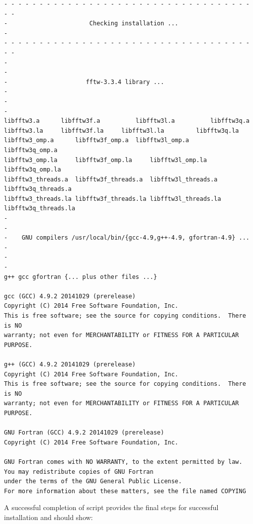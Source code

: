 \documentclass[a4paper,11pt]{article}
\begin{document}
\begin{verbatim}
- - - - - - - - - - - - - - - - - - - - - - - - - - - - - - - - - - - - -
-                       Checking installation ...                       -
- - - - - - - - - - - - - - - - - - - - - - - - - - - - - - - - - - - - -
-                                                                       -
-                      fftw-3.3.4 library ...                           -
-                                                                       -
libfftw3.a	    libfftw3f.a	         libfftw3l.a	      libfftw3q.a
libfftw3.la	    libfftw3f.la	 libfftw3l.la	      libfftw3q.la
libfftw3_omp.a	    libfftw3f_omp.a	 libfftw3l_omp.a      libfftw3q_omp.a
libfftw3_omp.la	    libfftw3f_omp.la     libfftw3l_omp.la     libfftw3q_omp.la
libfftw3_threads.a  libfftw3f_threads.a  libfftw3l_threads.a  libfftw3q_threads.a
libfftw3_threads.la libfftw3f_threads.la libfftw3l_threads.la libfftw3q_threads.la
-                                                                       -
-    GNU compilers /usr/local/bin/{gcc-4.9,g++-4.9, gfortran-4.9} ...   -
-                                                                       -
g++	gcc	gfortran {... plus other files ...}

gcc (GCC) 4.9.2 20141029 (prerelease)
Copyright (C) 2014 Free Software Foundation, Inc.
This is free software; see the source for copying conditions.  There is NO
warranty; not even for MERCHANTABILITY or FITNESS FOR A PARTICULAR PURPOSE.

g++ (GCC) 4.9.2 20141029 (prerelease)
Copyright (C) 2014 Free Software Foundation, Inc.
This is free software; see the source for copying conditions.  There is NO
warranty; not even for MERCHANTABILITY or FITNESS FOR A PARTICULAR PURPOSE.

GNU Fortran (GCC) 4.9.2 20141029 (prerelease)
Copyright (C) 2014 Free Software Foundation, Inc.

GNU Fortran comes with NO WARRANTY, to the extent permitted by law.
You may redistribute copies of GNU Fortran
under the terms of the GNU General Public License.
For more information about these matters, see the file named COPYING
\end{verbatim}
A successful completion of script provides the final steps for
successful installation and should show:
\end{document}
